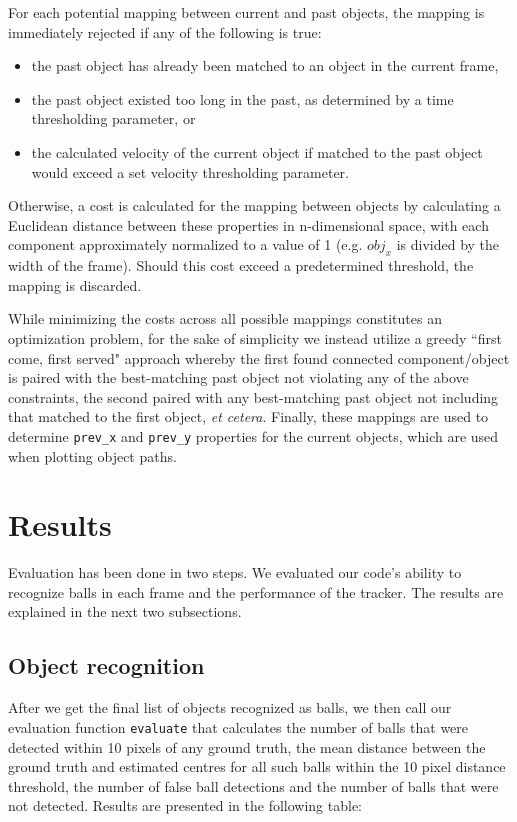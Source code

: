 \documentclass[12pt,a4paper]{article}
\begin{document}
For each potential mapping between current and past objects, the mapping is immediately rejected if any of the following is true:
\begin{itemize}
\item the past object has already been matched to an object in the current frame,
\item the past object existed too long in the past, as determined by a time thresholding parameter, or
\item the calculated velocity of the current object if matched to the past object would exceed a set velocity thresholding parameter.
\end{itemize}
Otherwise, a cost is calculated for the mapping between objects by calculating a Euclidean distance between these properties in n-dimensional space, with each component approximately normalized to a value of 1 (e.g. $obj_{x}$ is divided by the width of the frame). Should this cost exceed a predetermined threshold, the mapping is discarded.

While minimizing the costs across all possible mappings constitutes an optimization problem, for the sake of simplicity we instead utilize a greedy ``first come, first served" approach whereby the first found connected component/object is paired with the best-matching past object not violating any of the above constraints, the second paired with any best-matching past object not including that matched to the first object, \textit{et cetera}. Finally, these mappings are used to determine \texttt{prev\_x} and \texttt{prev\_y} properties for the current objects, which are used when plotting object paths.

\section{Results}
Evaluation has been done in two steps. We evaluated our code's ability to recognize balls in each frame and the performance of the tracker. The results are explained in the next two subsections.

\subsection{Object recognition}
After we get the final list of objects recognized as balls, we then call our evaluation function \texttt{evaluate} that calculates the number of balls that were detected within 10 pixels of any ground truth, the mean distance between the ground truth and estimated centres for all such balls within the 10 pixel distance threshold, the number of false ball detections and the number of balls that were not detected. Results are presented in the following table:
\end{document}
